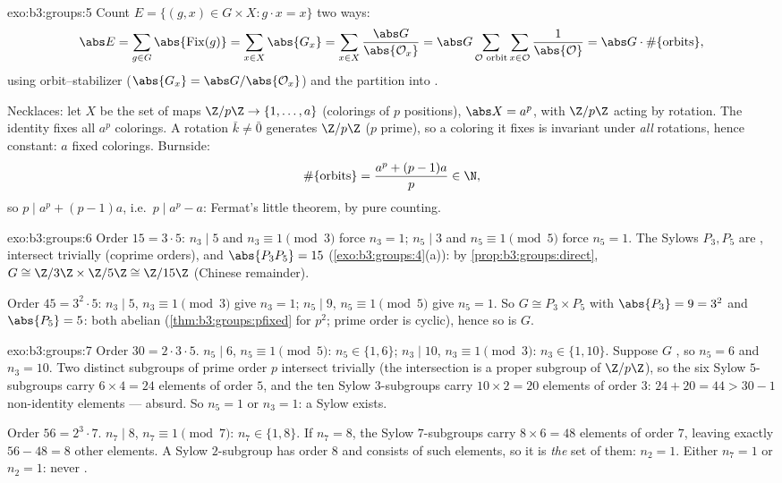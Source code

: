 \begin{solution}{exo:b3:groups:5}
Count $E = \{(g,x) \in G \times X : g \cdot x = x\}$ two ways:
\[
\abs E = \sum_{g \in G} \abs{\operatorname{Fix}(g)}
= \sum_{x \in X} \abs{G_x}
= \sum_{x \in X} \frac{\abs G}{\abs{\mathcal O_x}}
= \abs G \sum_{\mathcal O \text{ orbit}} \sum_{x \in \mathcal O}
\frac{1}{\abs{\mathcal O}}
= \abs G \cdot \#\{\text{orbits}\},
\]
using orbit--stabilizer ($\abs{G_x} = \abs G/\abs{\mathcal O_x}$)
and the partition into .

Necklaces: let $X$ be the set of maps $\Z/p\Z \to
\{1, \dots, a\}$ (colorings of $p$ positions), $\abs X = a^p$,
with $\Z/p\Z$ acting by rotation. The identity fixes all $a^p$
colorings. A rotation $\bar k \neq \bar 0$ generates $\Z/p\Z$ ($p$
prime), so a coloring it fixes is invariant under \emph{all}
rotations, hence constant: $a$ fixed colorings. Burnside:
\[
\#\{\text{orbits}\} = \frac{a^p + (p-1)a}{p} \in \N ,
\]
so $p \mid a^p + (p-1)a$, i.e.\ $p \mid a^p - a$: Fermat's little
theorem, by pure counting.
\end{solution}

\begin{solution}{exo:b3:groups:6}
Order $15 = 3 \cdot 5$: $n_3 \mid 5$ and $n_3 \equiv 1 \pmod 3$
force $n_3 = 1$; $n_5 \mid 3$ and $n_5 \equiv 1 \pmod 5$ force
$n_5 = 1$. The Sylows $P_3, P_5$ are , intersect trivially
(coprime orders), and $\abs{P_3P_5} = 15$
(\cref{exo:b3:groups:4}(a)): by \cref{prop:b3:groups:direct}, $G
\cong \Z/3\Z \times \Z/5\Z \cong \Z/15\Z$ (Chinese remainder).

Order $45 = 3^2 \cdot 5$: $n_3 \mid 5$, $n_3 \equiv 1 \pmod 3$
give $n_3 = 1$; $n_5 \mid 9$, $n_5 \equiv 1 \pmod 5$ give $n_5 =
1$. So $G \cong P_3 \times P_5$ with $\abs{P_3} = 9 = 3^2$ and
$\abs{P_5} = 5$: both abelian (\cref{thm:b3:groups:pfixed} for
$p^2$; prime order is cyclic), hence so is $G$.
\end{solution}

\begin{solution}{exo:b3:groups:7}
Order $30 = 2 \cdot 3 \cdot 5$. $n_5 \mid 6$, $n_5 \equiv 1 \pmod
5$: $n_5 \in \{1, 6\}$; $n_3 \mid 10$, $n_3 \equiv 1 \pmod 3$:
$n_3 \in \{1, 10\}$. Suppose $G$ , so $n_5 = 6$ and $n_3 =
10$. Two distinct subgroups of prime order $p$ intersect trivially
(the intersection is a proper subgroup of $\Z/p\Z$), so the six
Sylow $5$-subgroups carry $6 \times 4 = 24$ elements of order $5$,
and the ten Sylow $3$-subgroups carry $10 \times 2 = 20$ elements
of order $3$: $24 + 20 = 44 > 30 - 1$ non-identity elements ---
absurd. So $n_5 = 1$ or $n_3 = 1$: a  Sylow exists.

Order $56 = 2^3 \cdot 7$. $n_7 \mid 8$, $n_7 \equiv 1 \pmod 7$:
$n_7 \in \{1, 8\}$. If $n_7 = 8$, the Sylow $7$-subgroups carry $8
\times 6 = 48$ elements of order $7$, leaving exactly $56 - 48 =
8$ other elements. A Sylow $2$-subgroup has order $8$ and consists
of such elements, so it is \emph{the} set of them: $n_2 = 1$.
Either $n_7 = 1$ or $n_2 = 1$: never .
\end{solution}

